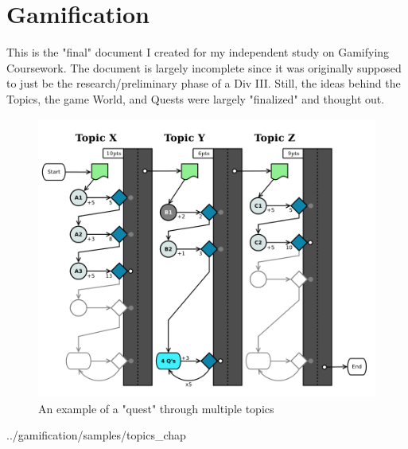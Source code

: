 \section{Gamification}

This is the "final" document I created for my independent study on Gamifying
Coursework.  The document is largely incomplete since it was originally
supposed to just be the research/preliminary phase of a Div III.  Still, the
ideas behind the Topics, the game World, and Quests were largely "finalized"
and thought out.

\vfill
\begin{figure}[h!]
    \label{fig:quest}
    \centering
    \includegraphics{../gamification/samples/quest.png}
    \caption[Gamification Quest]{An example of a "quest" through multiple topics}
\end{figure}
\vspace{1in}

\setlength{\fboxrule}{1pt}

{../gamification/samples/topics_chap}
